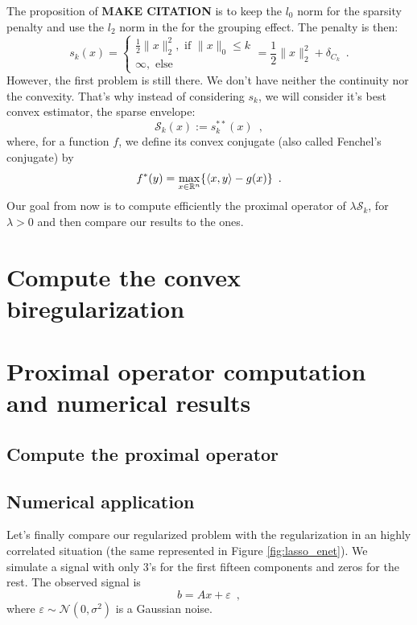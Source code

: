 \documentclass{article}
\begin{document}
The proposition of \textbf{MAKE CITATION} is to keep the $l_0$ norm for the sparsity penalty and use the $l_2$ norm in the \enet for the grouping effect. The penalty is then:
\[s_k(x)=\begin{cases} \frac{1}{2}\|x\|_2^2, \text{ if } \|x\|_0\leq k\\
\infty, \text{ else}\end{cases} = \frac{1}{2}\|x\|_2^2 + \delta_{C_k}\enspace.\]
However, the first problem is still there. We don't have neither the continuity nor the convexity. That's why instead of considering $s_k$, we will consider it's best convex estimator, the sparse envelope:
\[ \mathcal{S}_k(x) := s_k^{**}(x)\enspace,\]
where, for a function $f$, we define its convex conjugate (also called Fenchel's conjugate) by  
\begin{equation}\label{eq:conjugate}
    f^*(y)=\max_{x\in\mathbb{R}^n}\{\langle x, y\rangle - g(x)\}\enspace.
\end{equation}
Our goal from now is to compute efficiently the proximal operator of $\lambda \mathcal{S}_k$, for $\lambda >0$ and then compare our results to the \enet ones.


\section{Compute the convex biregularization}


\section{Proximal operator computation and numerical results}
\subsection{Compute the proximal operator}

\subsection{Numerical application}
Let's finally compare our regularized problem with the \enet
regularization in an highly correlated situation (the same represented in Figure \ref{fig:lasso_enet}).
We simulate a signal with only $3$'s for the first fifteen components and zeros for the rest. The observed signal is 
\[ b = Ax + \varepsilon\enspace,\]
where $\varepsilon\sim\mathcal{N}(0,\sigma^2)$ is a Gaussian noise.
\end{document}
